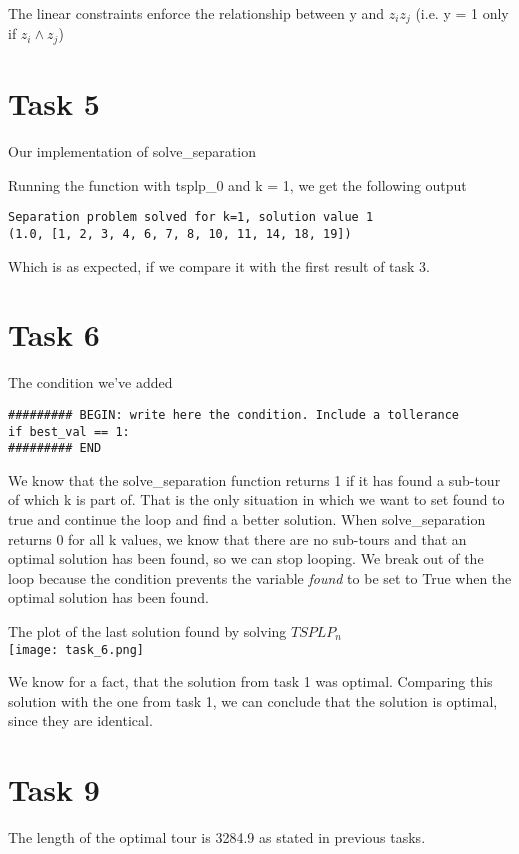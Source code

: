 \documentclass[a4paper,10pt]{article}
\begin{document}
The linear constraints enforce the relationship between y and $z_i z_j$ (i.e. y = 1 only if $z_i \land z_j $)


\section*{Task 5}
Our implementation of solve\_separation


Running the function with tsplp\_0 and k = 1, we get the following output
\begin{lstlisting}
Separation problem solved for k=1, solution value 1
(1.0, [1, 2, 3, 4, 6, 7, 8, 10, 11, 14, 18, 19])
\end{lstlisting}
Which is as expected, if we compare it with the first result of task 3.

\newpage
\section*{Task 6}
The condition we've added 

\begin{lstlisting}
######### BEGIN: write here the condition. Include a tollerance
if best_val == 1:
######### END
\end{lstlisting}

We know that the solve\_separation function returns 1 if it has found a sub-tour of which k is part of. That is the only situation  in which we want to set found to true and continue the loop and find a better solution. When solve\_separation returns  0 for all k values, we know that there are no sub-tours and that an optimal solution has been found, so we can stop looping. We break out of the loop because the condition prevents the variable \emph{found} to be set to True when the optimal solution has been found.

The plot of the last solution found by solving $TSPLP_n$ \\
\texttt{[image: task\_6.png]}

We know for a fact, that the solution from task 1 was optimal. Comparing this solution with the one from task 1, we can conclude that the solution is optimal, since they are identical.

\section*{Task 9}
The length of the optimal tour is 3284.9 as stated in previous tasks.
\end{document}
